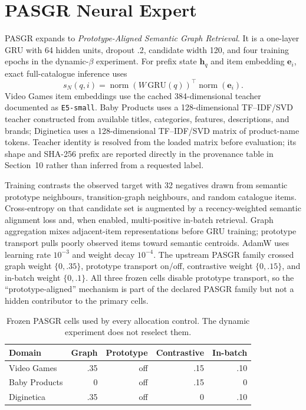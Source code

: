 \documentclass[runningheads]{llncs}
\begin{document}
\section{PASGR Neural Expert}
PASGR expands to \emph{Prototype-Aligned Semantic Graph Retrieval}. It is a
one-layer GRU with 64 hidden units, dropout .2, candidate width 120, and four
training epochs in the dynamic-$\beta$ experiment. For prefix state
$\mathbf h_q$ and item embedding $\mathbf e_i$, exact full-catalogue inference
uses
\[
s_N(q,i)=
\operatorname{norm}(W\,\mathrm{GRU}(q))^\top
\operatorname{norm}(\mathbf e_i).
\]
Video Games item embeddings use the cached 384-dimensional teacher documented
as \texttt{E5-small}. Baby Products uses a
128-dimensional TF--IDF/SVD teacher constructed from available titles,
categories, features, descriptions, and brands; Diginetica uses a
128-dimensional TF--IDF/SVD matrix of product-name tokens. Teacher identity
is resolved from the loaded matrix before evaluation; its shape and SHA-256
prefix are reported directly in the provenance table in Section~10 rather
than inferred from a requested label.

Training contrasts the observed target with 32 negatives drawn from semantic
prototype neighbours, transition-graph neighbours, and random catalogue
items. Cross-entropy on that candidate set is augmented by a recency-weighted
semantic alignment loss and, when enabled, multi-positive in-batch retrieval.
Graph aggregation mixes adjacent-item representations before GRU training;
prototype transport pulls poorly observed items toward semantic centroids.
AdamW uses learning rate $10^{-3}$ and weight decay $10^{-4}$.
The upstream PASGR family crossed graph weight $\{0,.35\}$, prototype
transport on/off, contrastive weight $\{0,.15\}$, and in-batch weight
$\{0,.1\}$. All three frozen cells disable prototype transport, so the
``prototype-aligned'' mechanism is part of the declared PASGR family but not a
hidden contributor to the primary cells.

\begin{table}[h]
\caption{Frozen PASGR cells used by every allocation control. The dynamic
experiment does not reselect them.}
\centering\small
\begin{tabular}{lrrrr}
\toprule
Domain & Graph & Prototype & Contrastive & In-batch\\
\midrule
Video Games & .35 & off & .15 & .10\\
Baby Products & 0 & off & .15 & 0\\
Diginetica & .35 & off & 0 & .10\\
\bottomrule
\end{tabular}
\end{table}
\end{document}
